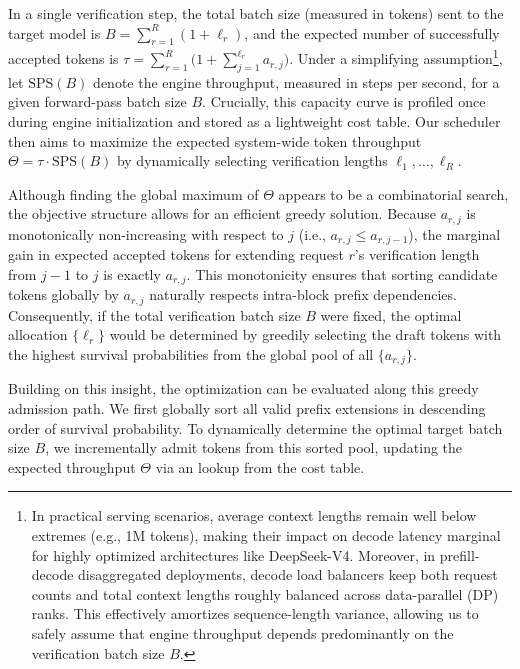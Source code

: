 In a single verification step, the total batch size (measured in tokens) sent to the target model is $B = \sum_{r=1}^{R} (1 + \ell_r)$, and the expected number of successfully accepted tokens is $\tau = \sum_{r=1}^{R} \bigl(1 + \sum_{j=1}^{\ell_r} a_{r,j}\bigr)$. 
Under a simplifying assumption\footnote{In practical serving scenarios, average context lengths remain well below extremes (e.g., 1M tokens), making their impact on decode latency marginal for highly optimized architectures like DeepSeek-V4. Moreover, in prefill-decode disaggregated deployments, decode load balancers keep both request counts and total context lengths roughly balanced across data-parallel (DP) ranks. This effectively amortizes sequence-length variance, allowing us to safely assume that engine throughput depends predominantly on the verification batch size $B$.}, let $\text{SPS}(B)$ denote the engine throughput, measured in steps per second, for a given forward-pass batch size $B$. Crucially, this capacity curve is profiled once during engine initialization and stored as a lightweight cost table. Our scheduler then aims to maximize the expected system-wide token throughput $\Theta = \tau \cdot \text{SPS}(B)$ by dynamically selecting verification lengths $\ell_1,\dots,\ell_R$.
  
Although finding the global maximum of $\Theta$ appears to be a combinatorial search, the objective structure allows for an efficient greedy solution. Because $a_{r,j}$ is monotonically non-increasing with respect to $j$ (i.e., $a_{r, j} \le a_{r, j-1}$), the marginal gain in expected accepted tokens for extending request $r$'s verification length from $j-1$ to $j$ is exactly $a_{r,j}$. This monotonicity ensures that sorting candidate tokens globally by $a_{r,j}$ naturally respects intra-block prefix dependencies. Consequently, if the total verification batch size $B$ were fixed, the optimal allocation $\{\ell_r\}$ would be determined by greedily selecting the draft tokens with the highest survival probabilities from the global pool of all $\{a_{r,j}\}$.

Building on this insight, the optimization can be evaluated along this greedy admission path. We first globally sort all valid prefix extensions in descending order of survival probability. To dynamically determine the optimal target batch size $B$, we incrementally admit tokens from this sorted pool, updating the expected throughput $\Theta$ via an lookup from the cost table. 

